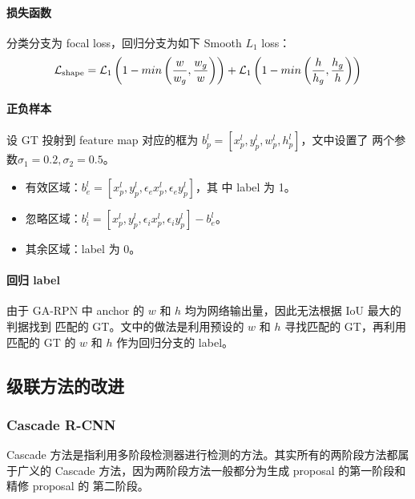 \paragraph{损失函数}
分类分支为 focal loss，回归分支为如下 Smooth $L_1$ loss：
\begin{equation}
  \mathcal{L}_{\mathrm{shape}} = \mathcal{L}_1 \left( 1 - \\min\left( \frac{w}{w_g}, \frac{w_g}{w} \right) \right) + \mathcal{L}_1 \left( 1 - \\min \left( \frac{h}{h_g}, \frac{h_g}{h} \right) \right)
\end{equation}

\paragraph{正负样本}
设 GT 投射到 feature map 对应的框为 $b_p^l =[x_p^l, y_p^l, w_p^l, h_p^l]$，文中设置了
两个参数$\sigma_1 = 0.2, \sigma_2 = 0.5$。

\begin{itemize}
  \item 有效区域：$b_e^l=[x_p^l, y_p^l, \epsilon_e x_p^l, \epsilon_e y_p^l]$，其
    中 label 为 1。
  \item 忽略区域：$b_i^l=[x_p^l, y_p^l, \epsilon_i x_p^l, \epsilon_i y_p^l] - b_e^l$。
  \item 其余区域：label 为 0。
\end{itemize}

\paragraph{回归 label}
由于 GA-RPN 中 anchor 的 $w$ 和 $h$ 均为网络输出量，因此无法根据 IoU 最大的判据找到
匹配的 GT。文中的做法是利用预设的 $w$ 和 $h$ 寻找匹配的 GT，再利用匹配的 GT 的 $w$ 和
$h$ 作为回归分支的 label。

\subsection{级联方法的改进}

\subsubsection{Cascade R-CNN}\label{subsub:cascade-rcnn}

Cascade 方法是指利用多阶段检测器进行检测的方法。其实所有的两阶段方法都属于广义的
Cascade 方法，因为两阶段方法一般都分为生成 proposal 的第一阶段和精修 proposal 的
第二阶段。

